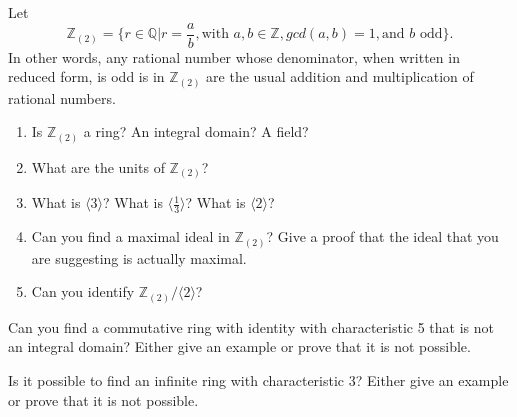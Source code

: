 \documentclass[12pt,letterpaper,boxed]{hmcpset}
\begin{document}
\begin{problem}[16.2.11]
Let $$ \mathbb{Z}_{(2)} = \{r \in \mathbb{Q} \vert r = \frac{a}{b}, \text{with } a,b \in \mathbb{Z}, gcd(a,b) = 1, \text{and } b \text{ odd} \}.$$
In other words, any rational number whose denominator, when written in reduced form, is odd is in $\mathbb{Z}_{(2)}$ are the usual addition and multiplication of rational numbers. 
\begin{enumerate}[label=\alph*]
\item Is $\mathbb{Z}_{(2)}$ a ring? An integral domain? A field?
\item What are the units of $\mathbb{Z}_{(2)}$?
\item What is $\langle 3 \rangle$? What is $\langle \frac{1}{3} \rangle$? What is $\langle 2 \rangle$?
\item Can you find a maximal ideal in $\mathbb{Z}_{(2)}$? Give a proof that the ideal that you are suggesting is actually maximal.
\item Can you identify $\mathbb{Z}_{(2)}/\langle 2 \rangle$?
\end{enumerate}
\end{problem}

\begin{solution}

\end{solution}

\clearpage 

\begin{problem}[16.3.1]
Can you find a commutative ring with identity with characteristic 5 that is not an integral domain? Either give an example or prove that it is not possible.
\end{problem}

\begin{solution}
\end{solution}

\clearpage

\begin{problem}[16.3.2]
Is it possible to find an infinite ring with characteristic 3? Either give an example or prove that it is not possible.
\end{problem}

\begin{solution}
\end{solution}
\end{document}
